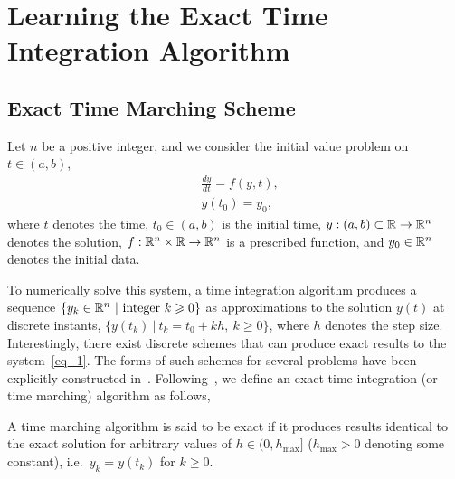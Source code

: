 \section{Learning the  Exact Time Integration Algorithm}
\label{sec_method}


\subsection{Exact Time Marching Scheme}


Let $n$ be a positive integer, and we
consider the initial value problem on $t\in(a,b)$,
\begin{subequations}\label{eq_1}
\begin{align}
  & \frac{dy}{dt} = f(y,t),  \label{eq_1a} \\
  & y(t_0) = y_0,  \label{eq_1b}
\end{align}
\end{subequations}
where $t$ denotes the time, $t_0\in(a,b)$ is
the initial time, 
$y: (a,b)\subset \mathbb{R}\rightarrow \mathbb{R}^n$
denotes the solution, $f: \mathbb{R}^n\times\mathbb{R} \rightarrow \mathbb{R}^n$
is a prescribed function, and $y_0\in \mathbb{R}^n$ denotes the initial data.

To numerically solve this system, a time integration algorithm
produces a sequence $\{ y_k\in\mbb R^n\ |\ \mathrm{integer}\ k\geqslant 0 \}$
as approximations to the solution $y(t)$  at
discrete instants, $\{y(t_k)\ |\ t_k=t_0+kh,\ k\geqslant 0 \}$,
where $h$ denotes the step size. Interestingly, there exist discrete schemes
that can produce  exact results to the system~\eqref{eq_1}.
The forms of such schemes for several problems
have been explicitly constructed  in~\cite{Mickens2021}.
Following~\cite{Mickens2021}, we define
an exact time integration (or time marching) algorithm as follows,

\begin{definition}
  A time marching algorithm is said to be exact if it produces results
  identical to the exact solution for arbitrary values of $h\in(0,h_{\max}]$
    ($h_{\max}>0$ denoting some constant),
    i.e.~$y_k=y(t_k)$ for $k\geqslant 0$.
\end{definition}


